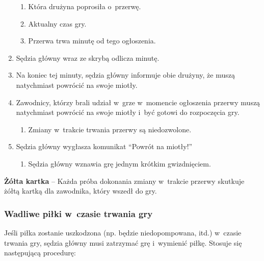 \documentclass[12pt]{article}
\newcommand\yellowcard[1]{\bgroup\textcolor{darkyellow}{\textbf{#1}}}
\begin{document}
\begin{enumerate}
	      \begin{enumerate}
		      \item
		            Która drużyna poprosiła o~przerwę.
		      \item
		            Aktualny czas gry.
		      \item
		            Przerwa trwa minutę od tego ogłoszenia.
	      \end{enumerate}
	\item
	      Sędzia główny wraz ze skrybą odlicza minutę.
	\item
	      Na koniec tej minuty, sędzia główny informuje obie drużyny, że muszą
	      natychmiast powrócić na swoje miotły.
	\item
	      Zawodnicy, którzy brali udział w~grze w~momencie ogłoszenia przerwy
	      muszą natychmiast powrócić na swoje miotły i~być gotowi do rozpoczęcia
	      gry.

	      \begin{enumerate}
		      \item
		            Zmiany w~trakcie trwania przerwy są niedozwolone.
	      \end{enumerate}
	\item
	      Sędzia główny wygłasza komunikat ``Powrót na miotły!''

	      \begin{enumerate}
		      \item
		            Sędzia główny wznawia grę jednym krótkim gwizdnięciem.
	      \end{enumerate}
\end{enumerate}

\yellowcard{Żółta kartka} -- Każda próba dokonania zmiany w~trakcie przerwy
skutkuje żółtą kartką dla zawodnika, który wszedł do gry.

\subsubsection{Wadliwe piłki w~czasie trwania gry}

Jeśli piłka zostanie uszkodzona (np. będzie niedopompowana, itd.) w~czasie trwania gry, sędzia główny musi zatrzymać grę i~wymienić piłkę.
Stosuje się następującą procedurę:
\end{document}
